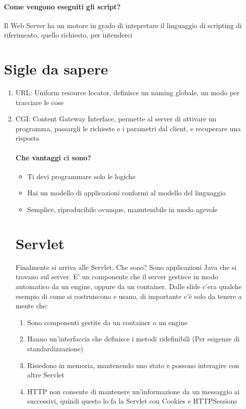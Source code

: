 \documentclass[12pt, a4paper, openany, twoside]{book}
\begin{document}
\paragraph{Come vengono eseguiti gli script?} Il Web Server ha un motore in grado
di intepretare il linguaggio di scripting di riferimento, quello richiesto, per intenderci
\section{Sigle da sapere}
\begin{enumerate}
	\item URL: Uniform resource locator, definisce un naming globale, un modo per 
	tracciare le cose
	\item CGI: Content Gateway Interface, permette al server di attivare un 
	programma, passargli le richieste e i parametri dal client, e recuperare 
	una risposta
	\paragraph{Che vantaggi ci sono?}
	\begin{itemize}
		\item Ti devi programmare solo le logiche
		\item Hai un modello di applicazioni conformi al modello del linguaggio
		\item Semplice, riproducibile ovunque, manutenibile in modo agevole
	\end{itemize}
	\section{Servlet}
	Finalmente si arriva alle Servlet. Che sono? Sono applicazioni Java che si 
	trovano sul server. E' un componente che il server gestisce in modo automatico
	da un engine, oppure da un container. 
	Dalle slide c'era qualche esempio di come si costruiscono e usano, di 
	importante c'è solo da tenere a mente che:
	\begin{enumerate}
		\item Sono componenti gestite da un container o un engine
		\item Hanno un'interfaccia che definisce i metodi ridefinibili (Per
		esigenze di standardizzazione)
		\item Risiedono in memoria, mantenendo uno stato e possono interagire
		con altre Servlet
		\item HTTP non consente di mantenere un'informazione da un messaggio ai
		successivi, quindi questo lo fa la Servlet con Cookies e HTTPSessions
	\end{enumerate}
\end{enumerate}
\end{document}
